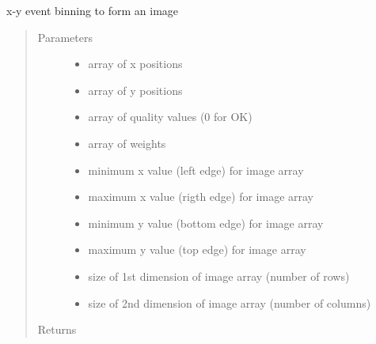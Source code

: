 \documentclass[letterpaper,10pt,english]{sphinxmanual}
\begin{document}
\begin{fulllineitems}
\label{\detokenize{images_functions:images.binxy}}
x-y event binning to form an image
\begin{quote}\begin{description}
\item[{Parameters}] \leavevmode\begin{itemize}
\item {} 
 \textendash{} array of x positions

\item {} 
 \textendash{} array of y positions

\item {} 
 \textendash{} array of quality values (0 for OK)

\item {} 
 \textendash{} array of weights

\item {} 
 \textendash{} minimum x value (left edge) for image array

\item {} 
 \textendash{} maximum x value (rigth edge) for image array

\item {} 
 \textendash{} minimum y value (bottom edge) for image array

\item {} 
 \textendash{} maximum y value (top edge) for image array

\item {} 
 \textendash{} size of 1st dimension of image array (number of rows)

\item {} 
 \textendash{} size of 2nd dimension of image array (number of columns)

\end{itemize}

\item[{Returns}] \leavevmode



\end{description}\end{quote}

\end{fulllineitems}
\end{document}
